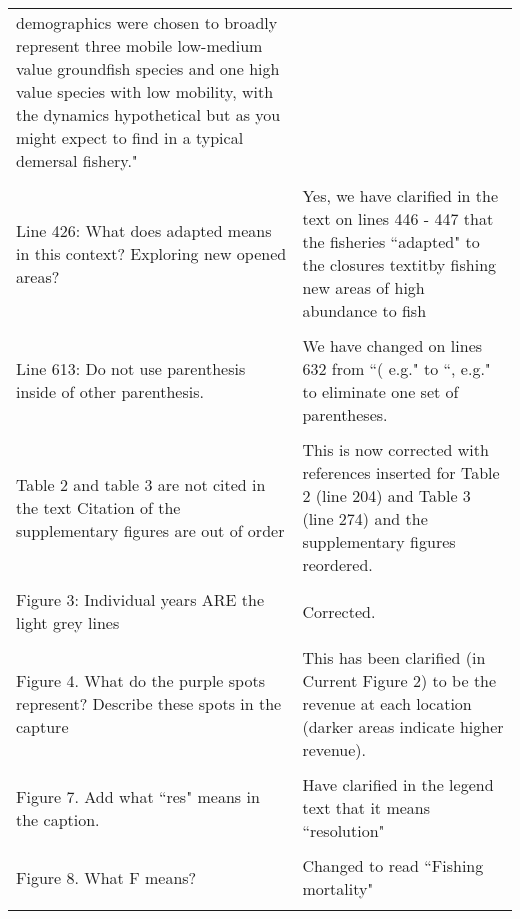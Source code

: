 \documentclass[10pt]{letter}
\begin{document}
\begin{center}
\begin{longtable}{p{8cm} | p{8cm}}
demographics were chosen to broadly represent three mobile low-medium value
groundfish species and one high value species with low mobility, with the
dynamics hypothetical but as you might expect to find in a typical demersal
fishery." \\
\\ 
Line 426: What does adapted means in this context? Exploring new opened areas?
& Yes, we have clarified in the text on lines 446 - 447 that the
fisheries ``adapted" to the closures textit{by fishing new areas of high
	abundance to fish}\\
\\
Line 613: Do not use parenthesis inside of other parenthesis. & We have changed
on lines 632 from ``( e.g." to ``, e.g." to eliminate one set of parentheses.
\\
\\
Table 2 and table 3 are not cited in the text Citation of the supplementary
figures are out of order & This is now corrected with references inserted for
Table 2 (line 204) and Table 3 (line 274) and the supplementary figures
reordered. \\
\\
Figure 3: Individual years ARE the light grey lines    & Corrected. \\
\\
Figure 4. What do the purple spots represent? Describe these spots in the
capture & This has been clarified (in Current Figure 2) to be the revenue at
each location (darker areas indicate higher revenue). \\ 
\\
Figure 7. Add what ``res"  means in the caption.  & Have clarified in the
legend text that it means ``resolution" \\
\\
Figure 8. What F means? & Changed to read ``Fishing mortality" \\
\\
		\bottomrule
	\end{longtable}

\end{center}
\end{document}
